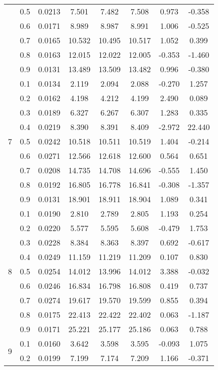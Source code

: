 \documentclass[11pt,a4paper]{report}
\begin{document}
\begin{longtable}{ | c | c || c | c | c | c | c | c | }
 & 0.5 & 0.0213 & 7.501 & 7.482 & 7.508 & 0.973 & -0.358 \\
 & 0.6 & 0.0171 & 8.989 & 8.987 & 8.991 & 1.006 & -0.525 \\
 & 0.7 & 0.0165 & 10.532 & 10.495 & 10.517 & 1.052 & 0.399 \\
 & 0.8 & 0.0163 & 12.015 & 12.022 & 12.005 & -0.353 & -1.460 \\
 & 0.9 & 0.0131 & 13.489 & 13.509 & 13.482 & 0.996 & -0.380 \\
 \hline
\multirow{9}{*}{7} & 0.1 & 0.0134 & 2.119 & 2.094 & 2.088 & -0.270 & 1.257 \\
 & 0.2 & 0.0162 & 4.198 & 4.212 & 4.199 & 2.490 & 0.089 \\
 & 0.3 & 0.0189 & 6.327 & 6.267 & 6.307 & 1.283 & 0.335 \\
 & 0.4 & 0.0219 & 8.390 & 8.391 & 8.409 & -2.972 & 22.440 \\
 & 0.5 & 0.0242 & 10.518 & 10.511 & 10.519 & 1.404 & -0.214 \\
 & 0.6 & 0.0271 & 12.566 & 12.618 & 12.600 & 0.564 & 0.651 \\
 & 0.7 & 0.0208 & 14.735 & 14.708 & 14.696 & -0.555 & 1.450 \\
 & 0.8 & 0.0192 & 16.805 & 16.778 & 16.841 & -0.308 & -1.357 \\
 & 0.9 & 0.0131 & 18.901 & 18.911 & 18.904 & 1.089 & 0.341 \\
 \hline
\multirow{9}{*}{8} & 0.1 & 0.0190 & 2.810 & 2.789 & 2.805 & 1.193 & 0.254 \\
 & 0.2 & 0.0220 & 5.577 & 5.595 & 5.608 & -0.479 & 1.753 \\
 & 0.3 & 0.0228 & 8.384 & 8.363 & 8.397 & 0.692 & -0.617 \\
 & 0.4 & 0.0249 & 11.159 & 11.219 & 11.209 & 0.107 & 0.830 \\
 & 0.5 & 0.0254 & 14.012 & 13.996 & 14.012 & 3.388 & -0.032 \\
 & 0.6 & 0.0246 & 16.834 & 16.798 & 16.808 & 0.419 & 0.737 \\
 & 0.7 & 0.0274 & 19.617 & 19.570 & 19.599 & 0.855 & 0.394 \\
 & 0.8 & 0.0175 & 22.413 & 22.422 & 22.402 & 0.063 & -1.187 \\
 & 0.9 & 0.0171 & 25.221 & 25.177 & 25.186 & 0.063 & 0.788 \\
 \hline
\multirow{9}{*}{9} & 0.1 & 0.0160 & 3.642 & 3.598 & 3.595 & -0.093 & 1.075 \\
 & 0.2 & 0.0199 & 7.199 & 7.174 & 7.209 & 1.166 & -0.371 \\

\end{longtable}
\end{document}
